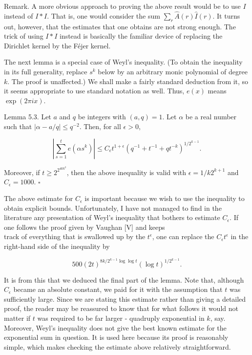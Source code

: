 \documentclass[10pt]{article}
\begin{document}
Remark. A more obvious approach to proving the above result would be to use $I$ instead of $I * I$. That is, one would consider the sum $\sum_{r} \hat{A}(r) \hat{I}(r)$. It turns out, however, that the estimates that one obtains are not strong enough. The trick of using $I * I$ instead is basically the familiar device of replacing the Dirichlet kernel by the Féjer kernel.

The next lemma is a special case of Weyl's inequality. (To obtain the inequality in its full generality, replace $s^{k}$ below by an arbitrary monic polynomial of degree $k$. The proof is unaffected.) We shall make a fairly standard deduction from it, so it seems appropriate to use standard notation as well. Thus, $e(x)$ means $\exp (2 \pi i x)$.

Lemma 5.3. Let $a$ and $q$ be integers with $(a, q)=1$. Let $\alpha$ be a real number such that $|\alpha-a / q| \leqslant q^{-2}$. Then, for all $\epsilon>0$,

$$
\left|\sum_{s=1}^{t} e\left(\alpha s^{k}\right)\right| \leqslant C_{\epsilon} t^{1+\epsilon}\left(q^{-1}+t^{-1}+q t^{-k}\right)^{1 / 2^{k-1}} .
$$

Moreover, if $t \geqslant 2^{2^{40 k^{3}}}$, then the above inequality is valid with $\epsilon=1 / k 2^{k+1}$ and $C_{\epsilon}=1000$. \(\square\)


The above estimate for $C_{\epsilon}$ is important because we wish to use the inequality to obtain explicit bounds. Unfortunately, I have not managed to find in the literature any presentation of Weyl's inequality that bothers to estimate $C_{\epsilon}$. If one follows the proof given by Vaughan [V] and keeps\\
track of everything that is swallowed up by the $t^{\epsilon}$, one can replace the $C_{\epsilon} t^{\epsilon}$ in the right-hand side of the inequality by

$$
500(2 t)^{8 k / 2^{k-1} \log \log t}(\log t)^{1 / 2^{k-1}} .
$$

It is from this that we deduced the final part of the lemma. Note that, although $C_{\epsilon}$ became an absolute constant, we paid for it with the assumption that $t$ was sufficiently large. Since we are stating this estimate rather than giving a detailed proof, the reader may be reassured to know that for what follows it would not matter if $t$ was required to be far larger - quadruply exponential in $k$, say. Moreover, Weyl's inequality does not give the best known estimate for the exponential sum in question. It is used here because its proof is reasonably simple, which makes checking the estimate above relatively straightforward.
\end{document}
